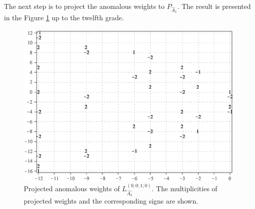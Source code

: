 \documentclass[12pt]{iopart}
\theoremstyle{definition}
\begin{document}
The next step is to project the anomalous weights to $P_{\hat A_1}$.
The result is presented in the Figure \ref{fig:AffineA2_A1_anom_proj} up to the twelfth grade.
\begin{figure}[h!tb]
  \centering
  \includegraphics[width=130mm]{figure8.eps}
  \caption{Projected anomalous weights of $L^{(0,0;1;0)}_{\hat{A_2}}$. The multiplicities of projected weights and the corresponding signs are shown. }
  \label{fig:AffineA2_A1_anom_proj}
\end{figure}
\end{document}
